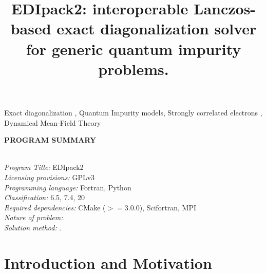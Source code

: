 \documentclass[final,3p,10pt]{elsarticle}
\begin{document}
\begin{frontmatter}

\title{EDIpack2: interoperable Lanczos-based exact diagonalization solver for
  generic quantum impurity problems.}


\begin{abstract}
  
\end{abstract}

\begin{keyword}
  Exact diagonalization \sep
  Quantum Impurity models\sep  
  Strongly correlated electrons \sep  
  Dynamical Mean-Field Theory
\end{keyword}

\end{frontmatter}

\noindent
{\bf PROGRAM SUMMARY}
\begin{small}
  \noindent
  \\
  {\em Program Title:}  EDIpack2                                        \\
{\em Licensing provisions:} GPLv3\\
{\em Programming language:}  Fortran, Python \\
{\em Classification:} 6.5, 7.4, 20 \\
{\em Required dependencies:} CMake ($>=3.0.0$), Scifortran, MPI\\
{\em Nature of problem:}. \\
{\em Solution method:} .\\
\end{small}

\section{Introduction and Motivation}\label{SecIntro}
\end{document}
